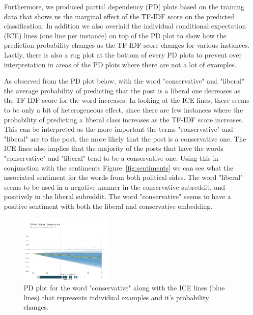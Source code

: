 \documentclass[conference]{IEEEtran}
\begin{document}
Furthermore, we produced partial dependency (PD) plots  based on the training data that shows us the marginal effect of the TF-IDF score on the predicted classification. In addition we also overlaid the individual conditional expectation (ICE)  lines (one line per instance) on top of the PD plot to show how the prediction probability changes as the TF-IDF score changes for various instances. Lastly, there is also a rug plot at the bottom of every PD plots to prevent over interpretation in areas of the PD plots where there are not a lot of examples.

As observed from the PD plot below, with the word "conservative" and "liberal" the average probability of predicting that the post is a liberal one decreases as the TF-IDF score for the word increases. In looking at the ICE lines, there seems to be only a bit of heterogeneous effect, since there are few instances where the probability of predicting a liberal class increases as the TF-IDF score increases. This can be interpreted as the more important the terms "conservative" and "liberal"  are to the post, the more likely that the post is a conservative one. The ICE lines also implies that the majority of the posts that have the words "conservative" and "liberal" tend to be a conservative one. Using this in conjunction with the sentiments Figure~\ref{fig:sentiments} we can see what the associated sentiment for the words from both political sides. The word "liberal" seems to be used in a negative manner in the conservative subreddit, and positively in the liberal subreddit. The word "conservative" seems to have a positive sentiment with both the liberal and conservative embedding.

\begin{figure}[tb]
    \centering
    \includegraphics[width=0.4\textwidth]{conservative_pdp.pdf}
    \vspace{-2mm}
    \caption{PD plot for the word "conservative" along with the ICE lines (blue lines) that represents individual examples and it's probability changes.}
    \label{fig:conservative_pdp}
    \vspace{-5mm}
\end{figure}
\end{document}

